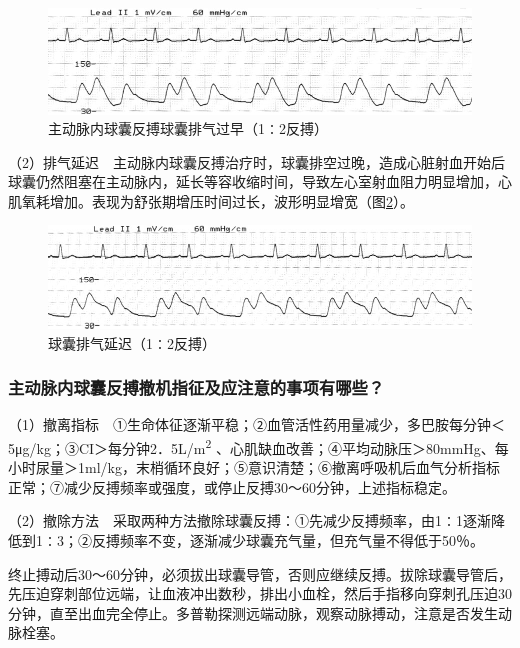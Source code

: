 \begin{figure}[!htbp]
 \centering
 \includegraphics{./images/Image00026.jpg}
 \captionsetup{justification=centering}
 \caption{主动脉内球囊反搏球囊排气过早（1∶2反搏）}
 \label{fig2-7}
  \end{figure} 

（2）排气延迟　主动脉内球囊反搏治疗时，球囊排空过晚，造成心脏射血开始后球囊仍然阻塞在主动脉内，延长等容收缩时间，导致左心室射血阻力明显增加，心肌氧耗增加。表现为舒张期增压时间过长，波形明显增宽（图\ref{fig2-8}）。

\begin{figure}[!htbp]
 \centering
 \includegraphics{./images/Image00027.jpg}
 \captionsetup{justification=centering}
 \caption{球囊排气延迟（1∶2反搏）}
 \label{fig2-8}
  \end{figure} 

\subsubsection{主动脉内球囊反搏撤机指征及应注意的事项有哪些？}

（1）撤离指标　①生命体征逐渐平稳；②血管活性药用量减少，多巴胺每分钟＜5μg/kg；③CI＞每分钟2．5L/m\textsuperscript{2}
、心肌缺血改善；④平均动脉压＞80mmHg、每小时尿量＞1ml/kg，末梢循环良好；⑤意识清楚；⑥撤离呼吸机后血气分析指标正常；⑦减少反搏频率或强度，或停止反搏30～60分钟，上述指标稳定。

（2）撤除方法　采取两种方法撤除球囊反搏：①先减少反搏频率，由1∶1逐渐降低到1∶3；②反搏频率不变，逐渐减少球囊充气量，但充气量不得低于50％。

终止搏动后30～60分钟，必须拔出球囊导管，否则应继续反搏。拔除球囊导管后，先压迫穿刺部位远端，让血液冲出数秒，排出小血栓，然后手指移向穿刺孔压迫30分钟，直至出血完全停止。多普勒探测远端动脉，观察动脉搏动，注意是否发生动脉栓塞。

